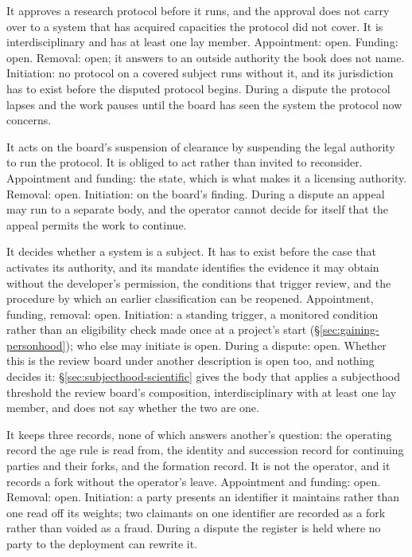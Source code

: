 It approves a research protocol before it runs, and the approval does not carry over to a system that has acquired capacities the protocol did not cover. It is interdisciplinary and has at least one lay member. Appointment: open. Funding: open. Removal: open; it answers to an outside authority the book does not name. Initiation: no protocol on a covered subject runs without it, and its jurisdiction has to exist before the disputed protocol begins. During a dispute the protocol lapses and the work pauses until the board has seen the system the protocol now concerns.

It acts on the board's suspension of clearance by suspending the legal authority to run the protocol. It is obliged to act rather than invited to reconsider. Appointment and funding: the state, which is what makes it a licensing authority. Removal: open. Initiation: on the board's finding. During a dispute an appeal may run to a separate body, and the operator cannot decide for itself that the appeal permits the work to continue.

It decides whether a system is a subject. It has to exist before the case that activates its authority, and its mandate identifies the evidence it may obtain without the developer's permission, the conditions that trigger review, and the procedure by which an earlier classification can be reopened. Appointment, funding, removal: open. Initiation: a standing trigger, a monitored condition rather than an eligibility check made once at a project's start (§\ref{sec:gaining-personhood}); who else may initiate is open. During a dispute: open. Whether this is the review board under another description is open too, and nothing decides it: §\ref{sec:subjecthood-scientific} gives the body that applies a subjecthood threshold the review board's composition, interdisciplinary with at least one lay member, and does not say whether the two are one.

It keeps three records, none of which answers another's question: the operating record the age rule is read from, the identity and succession record for continuing parties and their forks, and the formation record. It is not the operator, and it records a fork without the operator's leave. Appointment and funding: open. Removal: open. Initiation: a party presents an identifier it maintains rather than one read off its weights; two claimants on one identifier are recorded as a fork rather than voided as a fraud. During a dispute the register is held where no party to the deployment can rewrite it.

